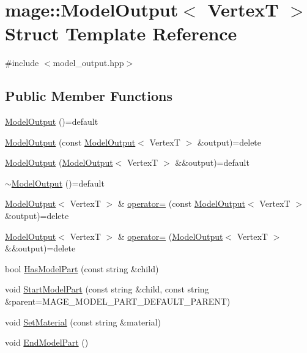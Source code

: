 \hypertarget{structmage_1_1_model_output}{}\section{mage\+:\+:Model\+Output$<$ VertexT $>$ Struct Template Reference}
\label{structmage_1_1_model_output}


{\ttfamily \#include $<$model\+\_\+output.\+hpp$>$}

\subsection*{Public Member Functions}
\begin{DoxyCompactItemize}
\item 
\hyperlink{structmage_1_1_model_output_a7d64b57d8207968541eb9c6da6ef0163}{Model\+Output} ()=default
\item 
\hyperlink{structmage_1_1_model_output_aac808e40a66f33da4ea28ebb7443623d}{Model\+Output} (const \hyperlink{structmage_1_1_model_output}{Model\+Output}$<$ VertexT $>$ \&output)=delete
\item 
\hyperlink{structmage_1_1_model_output_a20faa6e5b76ec7903a09e222e61e5353}{Model\+Output} (\hyperlink{structmage_1_1_model_output}{Model\+Output}$<$ VertexT $>$ \&\&output)=default
\item 
\hyperlink{structmage_1_1_model_output_a69a7f27486ad287943cbf973107ad8e1}{$\sim$\+Model\+Output} ()=default
\item 
\hyperlink{structmage_1_1_model_output}{Model\+Output}$<$ VertexT $>$ \& \hyperlink{structmage_1_1_model_output_ada52bf380c0259a0d7ef855457e5a9da}{operator=} (const \hyperlink{structmage_1_1_model_output}{Model\+Output}$<$ VertexT $>$ \&output)=delete
\item 
\hyperlink{structmage_1_1_model_output}{Model\+Output}$<$ VertexT $>$ \& \hyperlink{structmage_1_1_model_output_a5e368e3ae8a52d329f8d9b5f1c4b9d03}{operator=} (\hyperlink{structmage_1_1_model_output}{Model\+Output}$<$ VertexT $>$ \&\&output)=delete
\item 
bool \hyperlink{structmage_1_1_model_output_a23ce6e3b252227781c173149b76e73ee}{Has\+Model\+Part} (const string \&child)
\item 
void \hyperlink{structmage_1_1_model_output_a86b2e4d9885193fb796b309e6104abc9}{Start\+Model\+Part} (const string \&child, const string \&parent=M\+A\+G\+E\+\_\+\+M\+O\+D\+E\+L\+\_\+\+P\+A\+R\+T\+\_\+\+D\+E\+F\+A\+U\+L\+T\+\_\+\+P\+A\+R\+E\+NT)
\item 
void \hyperlink{structmage_1_1_model_output_abd614f9f2e9f9dbc0b2c354ee37f2998}{Set\+Material} (const string \&material)
\item 
void \hyperlink{structmage_1_1_model_output_a5df0c4240b1fac61ac0cdbf9766bb98d}{End\+Model\+Part} ()
\end{DoxyCompactItemize}
